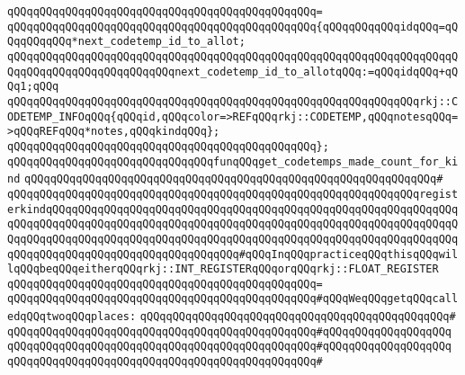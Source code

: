 \verb|qQQqqQQqqQQqqQQqqQQqqQQqqQQqqQQqqQQqqQQqqQQqqQQq=|\newline
\verb|qQQqqQQqqQQqqQQqqQQqqQQqqQQqqQQqqQQqqQQqqQQqqQQq{qQQqqQQqqQQqidqQQq=qQQqqQQqqQQq*next_codetemp_id_to_allot;|\newline
\verb|qQQqqQQqqQQqqQQqqQQqqQQqqQQqqQQqqQQqqQQqqQQqqQQqqQQqqQQqqQQqqQQqqQQqqQQqqQQqqQQqqQQqqQQqqQQqqQQqnext_codetemp_id_to_allotqQQq:=qQQqidqQQq+qQQq1;qQQq|\newline
\newline
\verb|qQQqqQQqqQQqqQQqqQQqqQQqqQQqqQQqqQQqqQQqqQQqqQQqqQQqqQQqqQQqqQQqrkj::CODETEMP_INFOqQQq{qQQqid,qQQqcolor=>REFqQQqrkj::CODETEMP,qQQqnotesqQQq=>qQQqREFqQQq*notes,qQQqkindqQQq};|\newline
\verb|qQQqqQQqqQQqqQQqqQQqqQQqqQQqqQQqqQQqqQQqqQQqqQQq};|\newline
\newline
\verb|qQQqqQQqqQQqqQQqqQQqqQQqqQQqqQQqfunqQQqget_codetemps_made_count_for_kind|\newline
\verb|qQQqqQQqqQQqqQQqqQQqqQQqqQQqqQQqqQQqqQQqqQQqqQQqqQQqqQQqqQQqqQQq#|\newline
\verb|qQQqqQQqqQQqqQQqqQQqqQQqqQQqqQQqqQQqqQQqqQQqqQQqqQQqqQQqqQQqqQQqregisterkindqQQqqQQqqQQqqQQqqQQqqQQqqQQqqQQqqQQqqQQqqQQqqQQqqQQqqQQqqQQqqQQqqQQqqQQqqQQqqQQqqQQqqQQqqQQqqQQqqQQqqQQqqQQqqQQqqQQqqQQqqQQqqQQqqQQqqQQqqQQqqQQqqQQqqQQqqQQqqQQqqQQqqQQqqQQqqQQqqQQqqQQqqQQqqQQqqQQqqQQqqQQqqQQqqQQqqQQqqQQqqQQqqQQqqQQqqQQqqQQq#qQQqInqQQqpracticeqQQqthisqQQqwillqQQqbeqQQqeitherqQQqrkj::INT_REGISTERqQQqorqQQqrkj::FLOAT_REGISTER|\newline
\verb|qQQqqQQqqQQqqQQqqQQqqQQqqQQqqQQqqQQqqQQqqQQqqQQq=|\newline
\verb|qQQqqQQqqQQqqQQqqQQqqQQqqQQqqQQqqQQqqQQqqQQqqQQq#qQQqWeqQQqgetqQQqcalledqQQqtwoqQQqplaces:|\newline
\verb|qQQqqQQqqQQqqQQqqQQqqQQqqQQqqQQqqQQqqQQqqQQqqQQq#|\newline
\verb|qQQqqQQqqQQqqQQqqQQqqQQqqQQqqQQqqQQqqQQqqQQqqQQq#qQQqqQQqqQQqqQQqqQQq|\newline
\verb|qQQqqQQqqQQqqQQqqQQqqQQqqQQqqQQqqQQqqQQqqQQqqQQq#qQQqqQQqqQQqqQQqqQQq|\newline
\verb|qQQqqQQqqQQqqQQqqQQqqQQqqQQqqQQqqQQqqQQqqQQqqQQq#|\newline

